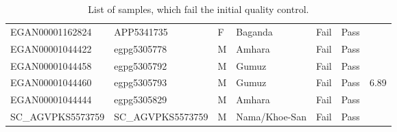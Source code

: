 \begin{table}[htp]
{\begin{tabular}{|l|l|l|l|l|l|l|}
EGAN00001162824 & APP5341735 & F & Baganda & Fail & Pass &  \\
EGAN00001044422 & egpg5305778 & M & Amhara & Fail & Pass & \\
EGAN00001044458 & egpg5305792 & M & Gumuz & Fail & Pass & \\
EGAN00001044460 & egpg5305793 & M & Gumuz & Fail & Pass & 6.89 \\
EGAN00001044444 & egpg5305829 & M & Amhara & Fail & Pass & \\
SC\_AGVPKS5573759 & SC\_AGVPKS5573759 & M & Nama/Khoe-San & Fail & Pass & \\
\hline
\end{tabular}
}
\caption{List of samples, which fail the initial quality control.}
\label{table:failQC}
\end{table}